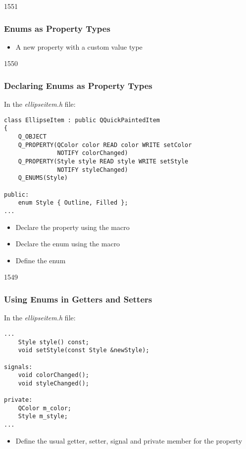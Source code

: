 \begin{slide}[fragile]{1551}\frametitle{Enums as Property Types}


\begin{itemize}
\item A new  property with a custom value type
\end{itemize}

\end{slide}

\begin{slide}[fragile]{1550}\frametitle{Declaring Enums as Property Types}

In the \textit{ellipseitem.h} file:

\vspace*{0.25em}
\begin{lstlisting}
class EllipseItem : public QQuickPaintedItem
{
    Q_OBJECT
    Q_PROPERTY(QColor color READ color WRITE setColor
               NOTIFY colorChanged)
    Q_PROPERTY(Style style READ style WRITE setStyle
               NOTIFY styleChanged)
    Q_ENUMS(Style)

public:
    enum Style { Outline, Filled };
...
\end{lstlisting}

\begin{itemize}
\item Declare the  property using the 
      macro
\item Declare the  enum using the 
      macro
\item Define the  enum
\end{itemize}

\end{slide}

\begin{slide}[fragile]{1549}\frametitle{Using Enums in Getters and Setters}

In the \textit{ellipseitem.h} file:

\vspace*{0.25em}
\begin{lstlisting}
...
    Style style() const;
    void setStyle(const Style &newStyle);

signals:
    void colorChanged();
    void styleChanged();

private:
    QColor m_color;
    Style m_style;
...
\end{lstlisting}

\begin{itemize}
\item Define the usual getter, setter, signal and private member for the
       property
\end{itemize}

\end{slide}

